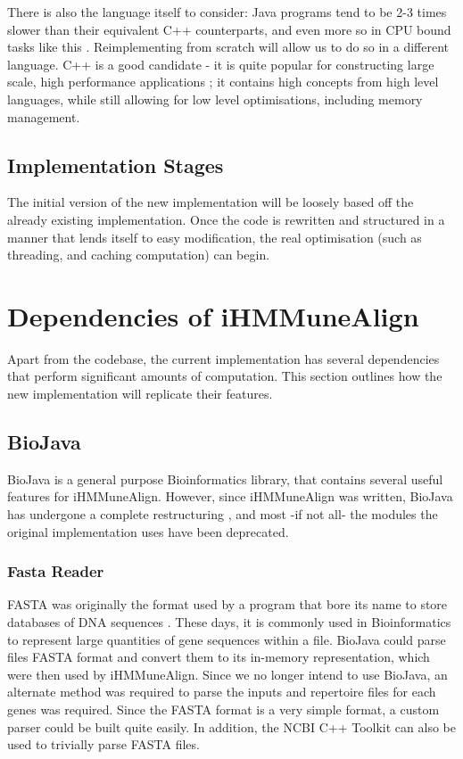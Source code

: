 There is also the language itself to consider: Java programs tend to be 2-3 times slower than their equivalent C++ counterparts, and even more so in CPU bound tasks like this \autocite{qtvjava}. Reimplementing from scratch will allow us to do so in a different language. C++ is a good candidate - it is quite popular for constructing large scale, high performance applications \autocite{cpp}; it contains high concepts from high level languages, while still allowing for low level optimisations, including memory management.

\subsection{Implementation Stages}
The initial version of the new implementation will be loosely based off the already existing implementation. Once the code is rewritten and structured in a manner that lends itself to easy modification, the real optimisation (such as threading, and caching computation) can begin.

\section{Dependencies of iHMMuneAlign}
Apart from the codebase, the current implementation has several dependencies that perform significant amounts of computation. This section outlines how the new implementation will replicate their features.

\subsection{BioJava}
BioJava \autocite{biojava}is a general purpose Bioinformatics library, that contains several useful features for iHMMuneAlign. However, since iHMMuneAlign was written, BioJava has undergone a complete restructuring \autocite{biojava3}, and most -if not all- the modules the original implementation uses have been deprecated.

\subsubsection{Fasta Reader}
FASTA was originally the format used by a program that bore its name to store databases of DNA sequences \autocite{fasta}. These days, it is commonly used in Bioinformatics to represent large quantities of gene sequences within a file. BioJava could parse files FASTA format and convert them to its in-memory representation, which were then used by iHMMuneAlign. Since we no longer intend to use BioJava, an alternate method was required to parse the inputs and repertoire files for each genes was required. Since the FASTA format is a very simple format, a custom parser could be built quite easily. In addition, the NCBI C++ Toolkit can also be used to trivially parse FASTA files.

